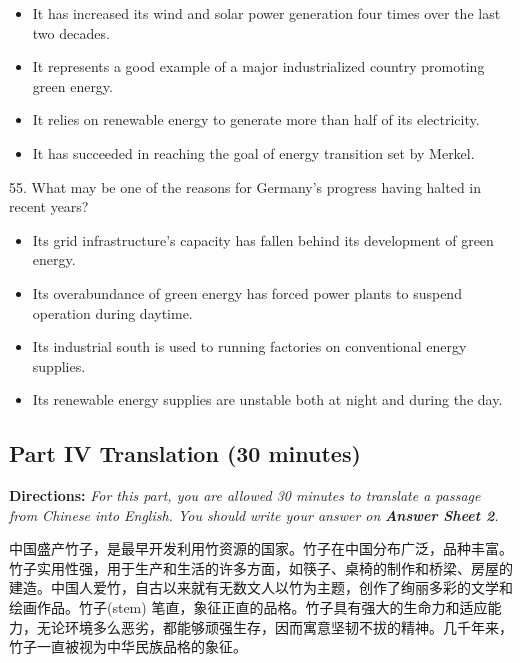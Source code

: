 \documentclass[UTF8,11pt]{ctexart}
\begin{document}
\begin{itemize}[leftmargin=2em,itemsep=.2em,topsep=.4em]\item[A.] It has increased its wind and solar power generation four times over the last two decades.
\item[B.] It represents a good example of a major industrialized country promoting green energy.
\item[C.] It relies on renewable energy to generate more than half of its electricity.
\item[D.] It has succeeded in reaching the goal of energy transition set by Merkel.
\end{itemize}

55. What may be one of the reasons for Germany’s progress having halted in recent years?


\begin{itemize}[leftmargin=2em,itemsep=.2em,topsep=.4em]\item[A.] Its grid infrastructure’s capacity has fallen behind its development of green energy.
\item[B.] Its overabundance of green energy has forced power plants to suspend operation during daytime.
\item[C.] Its industrial south is used to running factories on conventional energy supplies.
\item[D.] Its renewable energy supplies are unstable both at night and during the day.
\end{itemize}

\subsection*{\textbf{Part IV Translation} \textbf{(30 minutes)}}


\textbf{Directions: }\textit{For this part, you are allowed 30 minutes to translate a passage from Chinese into English. You should} \textit{write your answer on }\textbf{\textit{Answer Sheet 2}}\textit{.}


中国盛产竹子，是最早开发利用竹资源的国家。竹子在中国分布广泛，品种丰富。竹子实用性强，用于生产和生活的许多方面，如筷子、桌椅的制作和桥梁、房屋的建造。中国人爱竹，自古以来就有无数文人以竹为主题，创作了绚丽多彩的文学和绘画作品。竹子(stem) 笔直，象征正直的品格。竹子具有强大的生命力和适应能力，无论环境多么恶劣，都能够顽强生存，因而寓意坚韧不拔的精神。几千年来，竹子一直被视为中华民族品格的象征。
\end{document}
